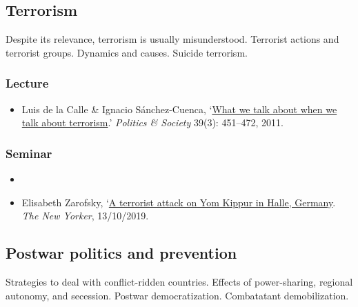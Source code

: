\documentclass[12pt, a4paper]{article}
\begin{document}
\hline %

\subsection{Terrorism}\label{terrorism}

Despite its relevance, terrorism is usually misunderstood. Terrorist actions and terrorist groups. Dynamics and causes. Suicide terrorism.

\subsubsection*{Lecture}

\begin{itemize}
\setlength\itemsep{0pt}
\item Luis de la Calle \& Ignacio Sánchez-Cuenca, `\href{https://doi.org/10.1177/0032329211415506}{What we talk about when we talk about terrorism}.' \textit{Politics \& Society} 39(3): 451--472, 2011.
\end{itemize}

\subsubsection*{Seminar}

\begin{itemize}
\setlength\itemsep{0pt}
\item {}
\item Elisabeth Zarofsky, `\href{https://www.newyorker.com/news/letter-from-europe/a-terrorist-attack-on-yom-kippur-in-halle-germany}{A terrorist attack on Yom Kippur in Halle, Germany}. \textit{The New Yorker}, 13/10/2019.
\end{itemize}

\hline %

\subsection{Postwar politics and prevention}\label{postwar}

Strategies to deal with conflict-ridden countries. Effects of power-sharing, regional autonomy, and secession. Postwar democratization. Combatatant demobilization.
\end{document}

